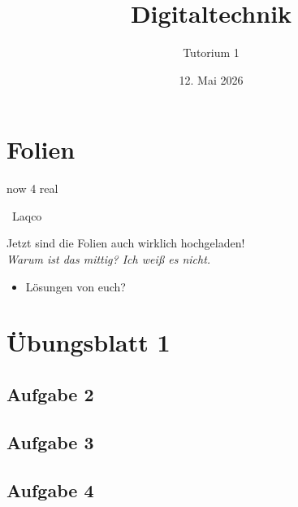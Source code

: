 \documentclass[aspectratio=169,usepdftitle=true,11pt,ngerman,t]{beamer}
\subtitle{Tutorium 1}
\date{12. Mai 2026}
\title{Digitaltechnik}
\begin{document}
\section*{Folien}
\begin{frame}{now 4 real}\onslide<+->
    \begin{block}{\faGithub~Laqco}
        \begin{minipage}{0.75\linewidth}
            Jetzt sind die Folien auch wirklich hochgeladen!
            \vspace{\baselineskip}\\
            \textit{Warum ist das mittig? Ich weiß es nicht.~}
        \end{minipage}\nolinebreak\hfill\begin{minipage}{0.25\linewidth}
            \vspace{0.107cm}
        \end{minipage}
    \end{block}\onslide<+->
    \begin{itemize}
        \item Lösungen von euch?
    \end{itemize}
\end{frame}

\section[Von Zahlen und Buchstaben\dots
\\\small Oder: Als ob ich schon korrigiert hätte \texttwemoji{joy}]{Übungsblatt 1}

\subsection{Aufgabe 2}


\subsection{Aufgabe 3}


\subsection{Aufgabe 4}

\end{document}
